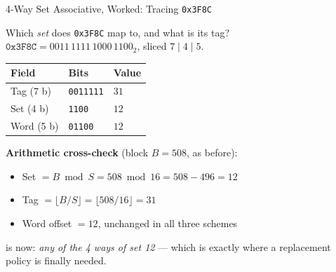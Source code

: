 \documentclass[aspectratio=169]{beamer}
\begin{document}
\begin{frame}{4-Way Set Associative, Worked: Tracing \texttt{0x3F8C}}
  \footnotesize
  \begin{exampleblock}{Which \emph{set} does \texttt{0x3F8C} map to, and what is its tag?}
    $\texttt{0x3F8C} = 0011\,1111\,1000\,1100_2$, sliced $7 \mid 4 \mid 5$.
  \end{exampleblock}
  \vspace{-0.1cm}
  \begin{center}
  \begin{tabular}{@{}lll@{}}
    \toprule
    \textbf{Field} & \textbf{Bits} & \textbf{Value} \\
    \midrule
    Tag (7 b)  & \texttt{0011111} & $31$ \\
    Set (4 b)  & \texttt{1100}    & $12$ \\
    Word (5 b) & \texttt{01100}   & $12$ \\
    \bottomrule
  \end{tabular}
  \end{center}
  \vspace{0.15cm}
  \textbf{Arithmetic cross-check} (block $B = 508$, as before):
  \begin{itemize}
    \item Set $= B \bmod S = 508 \bmod 16 = 508 - 496 = 12$ \good{\checkmark}
    \item Tag $= \lfloor B/S \rfloor = \lfloor 508/16 \rfloor = 31$
      \good{\checkmark}
    \item Word offset $= 12$, unchanged in all three schemes \good{\checkmark}
  \end{itemize}
   is now: \emph{any of the 4 ways of set
  12} --- which is exactly where a replacement policy is finally needed.
\end{frame}
\end{document}
